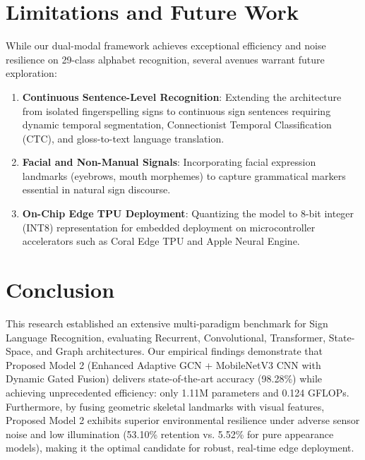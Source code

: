 \documentclass[journal]{IEEEtran}
\begin{document}
\section{Limitations and Future Work}
While our dual-modal framework achieves exceptional efficiency and noise resilience on 29-class alphabet recognition, several avenues warrant future exploration:
\begin{enumerate}
    \item \textbf{Continuous Sentence-Level Recognition}: Extending the architecture from isolated fingerspelling signs to continuous sign sentences requiring dynamic temporal segmentation, Connectionist Temporal Classification (CTC), and gloss-to-text language translation.
    \item \textbf{Facial and Non-Manual Signals}: Incorporating facial expression landmarks (eyebrows, mouth morphemes) to capture grammatical markers essential in natural sign discourse.
    \item \textbf{On-Chip Edge TPU Deployment}: Quantizing the model to 8-bit integer (INT8) representation for embedded deployment on microcontroller accelerators such as Coral Edge TPU and Apple Neural Engine.
\end{enumerate}

\section{Conclusion}
This research established an extensive multi-paradigm benchmark for Sign Language Recognition, evaluating Recurrent, Convolutional, Transformer, State-Space, and Graph architectures. Our empirical findings demonstrate that Proposed Model 2 (Enhanced Adaptive GCN + MobileNetV3 CNN with Dynamic Gated Fusion) delivers state-of-the-art accuracy (98.28\%) while achieving unprecedented efficiency: only 1.11M parameters and 0.124 GFLOPs. Furthermore, by fusing geometric skeletal landmarks with visual features, Proposed Model 2 exhibits superior environmental resilience under adverse sensor noise and low illumination (53.10\% retention vs. 5.52\% for pure appearance models), making it the optimal candidate for robust, real-time edge deployment.
\end{document}
